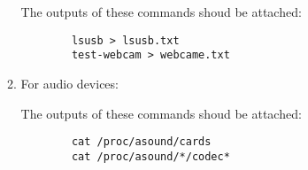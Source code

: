 \documentclass[a4paper,10pt]{article}
\begin{document}
\begin{itemize}
\begin{enumerate}
		The outputs of these commands shoud be attached:
		\begin{verbatim}
		lsusb > lsusb.txt
		test-webcam > webcame.txt
		\end{verbatim}
	\item  For audio devices:

		The outputs of these commands shoud be attached:
		\begin{verbatim}
		cat /proc/asound/cards
		cat /proc/asound/*/codec*
		\end{verbatim}
	\end{enumerate}
\end{itemize}
\end{document}
